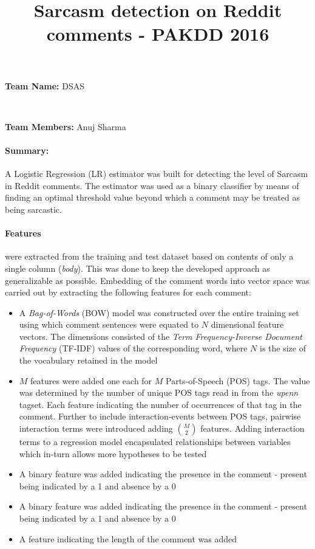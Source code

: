\documentclass[a4paper,10pt]{article}
\title{Sarcasm detection on Reddit comments - PAKDD 2016}
\begin{document}
\maketitle

{\raggedright \textbf{Team Name: }DSAS}\\

{\raggedright \textbf{Team Members: }Anuj Sharma\\}

\paragraph{Summary:} A Logistic Regression (LR) estimator was built for 
detecting the level of Sarcasm in Reddit comments. The estimator was used as a 
binary classifier by means of finding an optimal threshold value beyond which a 
comment may be treated as being sarcastic.

\paragraph{Features} were extracted from the training and test dataset based on 
contents of only a single column (\emph{body}). This was done to keep the 
developed approach as generalizable as possible. Embedding of the comment words 
into vector space was carried out by extracting the following features for each 
comment:
\begin{itemize}
  \item A \emph{Bag-of-Words} (BOW) model was constructed over the entire 
training set using which comment sentences were equated to $N$ dimensional 
feature vectors. The dimensions consisted of the \emph{Term Frequency-Inverse 
Document Frequency} (TF-IDF) values of the corresponding word, where $N$ is the 
size of the vocabulary retained in the model
  \item $M$ features were added one each for $M$ Parts-of-Speech (POS) tags. 
The value was determined by the number of unique POS tags read in from the 
\emph{upenn} tagset. Each feature indicating the number of occurrences of that 
tag in the comment. Further to include interaction-events between POS tags, 
pairwise interaction terms were introduced adding ${{M}\choose{2}}$ features. 
Adding interaction terms to a regression model encapsulated relationships 
between variables which in-turn allows more hypotheses to be tested
  \item A binary feature was added indicating the presence in the comment - 
present being indicated by a 1 and absence by a 0
  \item A binary feature was added indicating the presence in the comment - 
present being indicated by a 1 and absence by a 0
  \item A feature indicating the length of the comment was added
\end{itemize}
\end{document}
